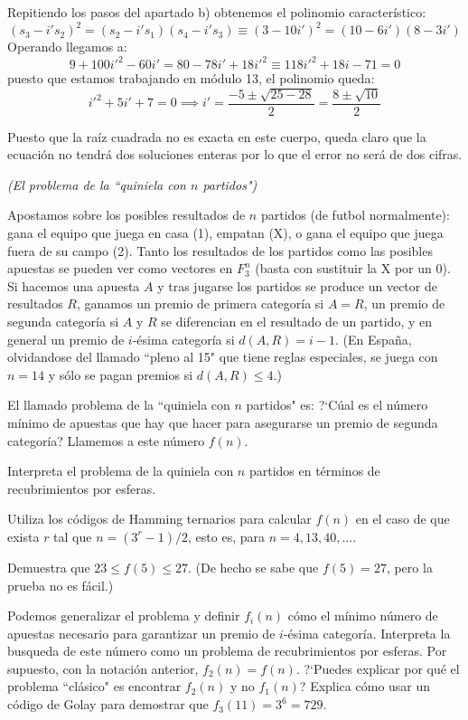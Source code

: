 \begin{problem}[13]
Repitiendo los pasos del apartado b) obtenemos el polinomio característico:
\[(s_3 - i's_2)^2 = (s_2 - i's_1)(s_4 - i's_3) \equiv (3-10i')^2 = (10-6i')(8-3i')\]
Operando llegamos a:
\[9+100i'^2-60i' = 80-78i'+18i'^2 \equiv 118i'^2 + 18i -71 = 0\]
puesto que estamos trabajando en módulo 13, el polinomio queda:
\[i'^2 +5i' +7=0 \implies i'=\frac{-5 \pm \sqrt{25-28}}{2}=\frac{8 \pm \sqrt{10}}{2}\]

Puesto que la raíz cuadrada no es exacta en este cuerpo, queda claro que la ecuación no tendrá dos soluciones enteras por lo que el error no será de dos cifras.
\end{problem}

\begin{problem}[14]
{\it (El problema de la ``quiniela con $n$
partidos")}

Apostamos sobre los posibles resultados de $n$ partidos
(de futbol normalmente): gana el equipo que juega en casa (1),
empatan (X), o gana el equipo que juega fuera de su campo (2).
Tanto los resultados de los partidos como las posibles apuestas se
pueden ver como vectores en $ F_3^{n}$ (basta con sustituir la X
por un $0$). Si hacemos una apuesta $A$ y tras jugarse los
partidos se produce un vector de resultados $R$, ganamos un premio
de primera categoría si $A=R$, un premio de segunda categoría si
$A$ y $R$ se diferencian en el resultado de un partido, y en
general un premio de $i$-ésima categoría si $d(A,R)=i-1$. (En
España, olvidandose del llamado ``pleno al 15" que tiene reglas
especiales, se juega con $n=14$ y sólo se pagan premios si
$d(A,R)\le 4$.)

El llamado problema de la ``quiniela con $n$ partidos" es: ?`Cúal
es el número mínimo de apuestas que hay que hacer para asegurarse
un premio de segunda categoría? Llamemos a este número $f(n)$.

\ppart  Interpreta el problema de la quiniela con $n$ partidos en
términos de recubrimientos por esferas.

\ppart Utiliza los códigos de Hamming ternarios para calcular $f(n)$
en el caso de que exista $r$ tal que $n=(3^r-1)/2$, esto es, para
$n=4,13,40,\dots$.

\ppart Demuestra que $23\le f(5)\le 27$. (De hecho se sabe que
$f(5)=27$, pero la prueba no es fácil.)

\ppart Podemos generalizar el problema y definir $f_i(n)$ cómo el
mínimo número de apuestas necesario para garantizar un premio de
$i$-ésima categoría. Interpreta la busqueda de este número como un
problema de recubrimientos por esferas. Por supuesto, con la
notación anterior, $f_2(n)=f(n)$. ?`Puedes explicar por qué el
problema ``clásico" es encontrar $f_2(n)$ y no $f_1(n)$? Explica
cómo usar un código de Golay para demostrar que $f_3
(11)=3^6=729$.


\end{problem}
